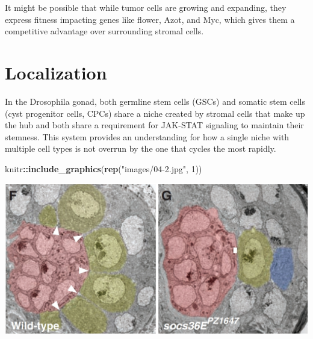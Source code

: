 \documentclass[]{book}
\newenvironment{Shaded}{\begin{snugshade}}{\end{snugshade}}
\newcommand{\KeywordTok}[1]{\textcolor[rgb]{0.13,0.29,0.53}{\textbf{#1}}}
\newcommand{\DataTypeTok}[1]{\textcolor[rgb]{0.13,0.29,0.53}{#1}}
\newcommand{\DecValTok}[1]{\textcolor[rgb]{0.00,0.00,0.81}{#1}}
\newcommand{\StringTok}[1]{\textcolor[rgb]{0.31,0.60,0.02}{#1}}
\newcommand{\OtherTok}[1]{\textcolor[rgb]{0.56,0.35,0.01}{#1}}
\newcommand{\OperatorTok}[1]{\textcolor[rgb]{0.81,0.36,0.00}{\textbf{#1}}}
\newcommand{\NormalTok}[1]{#1}
\begin{document}
It might be possible that while tumor cells are growing and expanding,
they express fitness impacting genes like flower, Azot, and Myc, which
gives them a competitive advantage over surrounding stromal cells.

\section{Localization}\label{localization}

In the Drosophila gonad, both germline stem cells (GSCs) and somatic
stem cells (cyst progenitor cells, CPCs) share a niche created by
stromal cells that make up the hub and both share a requirement for
JAK-STAT signaling to maintain their stemness. This system provides an
understanding for how a single niche with multiple cell types is not
overrun by the one that cycles the most rapidly.

\begin{Shaded}
\begin{Highlighting}[]
\NormalTok{knitr}\OperatorTok{::}\KeywordTok{include_graphics}\NormalTok{(}\KeywordTok{rep}\NormalTok{(}\StringTok{"images/04-2.jpg"}\NormalTok{, }\DecValTok{1}\NormalTok{))}
\end{Highlighting}
\end{Shaded}

\includegraphics{images/04-2.jpg}

\begin{Shaded}
\end{Shaded}
\end{document}
